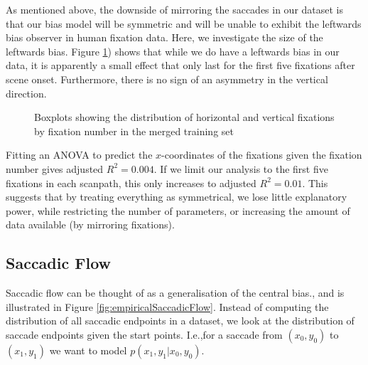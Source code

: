 \documentclass[a4paper, twocolumn, oneside, 10pt]{article}
\begin{document}
As mentioned above, the downside of mirroring the saccades in our dataset is that our bias model will be symmetric and will be unable to exhibit the leftwards bias observer in human fixation data. Here, we investigate the size of the leftwards bias. Figure \ref{fig:leftrightDist}) shows that while we do have a leftwards bias in our data, it is apparently a small effect that only last for the first five fixations after scene onset. Furthermore, there is no sign of an asymmetry in the vertical direction.

\begin{figure}
\centering
{}
\caption{Boxplots showing the distribution of horizontal and vertical fixations by fixation number in the merged training set}
\label{fig:leftrightDist}
\end{figure}

Fitting an ANOVA to predict the $x$-coordinates of the fixations given the fixation number gives adjusted $R^2=0.004$. If we limit our analysis to the first five fixations in each scanpath, this only increases to adjusted $R^2=0.01$. This suggests that by treating everything as symmetrical, we lose little explanatory power, while restricting the number of parameters, or increasing the amount of data available (by mirroring fixations). 

\subsection{Saccadic Flow}
\label{ModellingFlow}

Saccadic flow can be thought of as a generalisation of the central bias., and is illustrated in Figure \ref{fig:empiricalSaccadicFlow}. Instead of computing the distribution of all saccadic endpoints in a dataset, we look at the distribution of saccade endpoints given the start points. I.e.,for a saccade from $(x_0, y_0)$ to $(x_1, y_1)$ we want to model $p(x_1,y_1|x_0, y_0)$.
\end{document}
